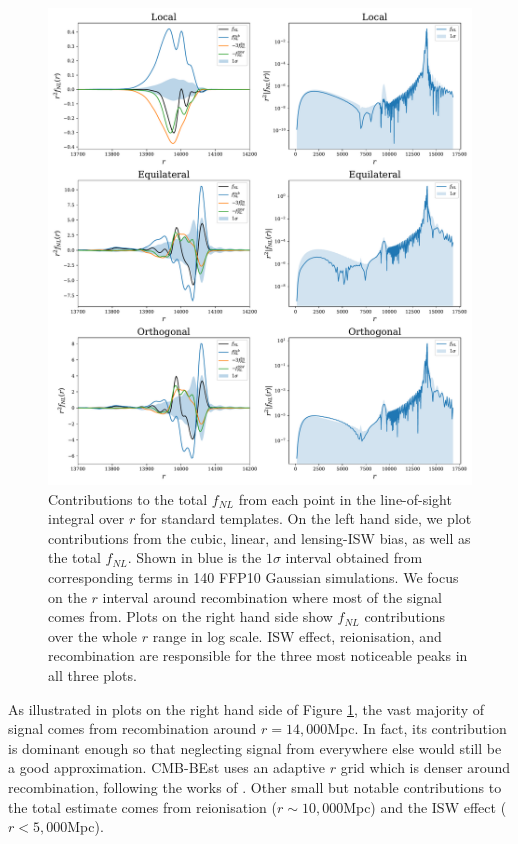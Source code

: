 \begin{figure}[htbp!] 
	\centering    
	\includegraphics[width=\textwidth]{trio_r_dependence.pdf}
	\caption{Contributions to the total $f_{NL}$ from each point in the line-of-sight integral over $r$ for standard templates. On the left hand side, we plot contributions from the cubic, linear, and lensing-ISW bias, as well as the total $f_{NL}$. Shown in blue is the $1\sigma$ interval obtained from corresponding terms in 140 FFP10 Gaussian simulations. We focus on the $r$ interval around recombination where most of the signal comes from. Plots on the right hand side show $f_{NL}$ contributions over the whole $r$ range in log scale. ISW effect, reionisation, and recombination are responsible for the three most noticeable peaks in all three plots.}
	\label{fig:trio_r_dependence}
\end{figure}

As illustrated in plots on the right hand side of Figure \ref{fig:trio_r_dependence}, the vast majority of signal comes from recombination around $r = 14,000$Mpc. In fact, its contribution is dominant enough so that neglecting signal from everywhere else would still be a good approximation. CMB-BEst uses an adaptive $r$ grid which is denser around recombination, following the works of \cite{Smith2011}. Other small but notable contributions to the total estimate comes from reionisation ($r \sim 10,000$Mpc) and the ISW effect ($r < 5,000$Mpc).

